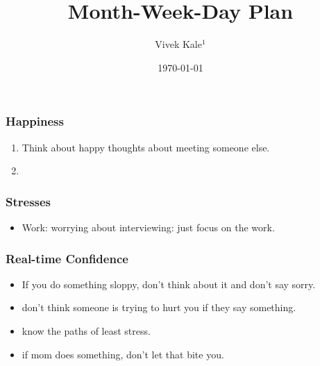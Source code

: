 \documentclass[serif, mathserif, final]{beamer}
\title{Month-Week-Day Plan}
\author{Vivek Kale$^1$}
\institute{$^1$ University of Illinois at Urbana-Champaign}
\date{\today}
\begin{document}
%

      \begin{frame}
        \frametitle{Happiness}
        \begin{enumerate}
          \item Think about happy thoughts about meeting
          someone else.
        \item \tiny
        \end{enumerate}
      \end{frame}

      \begin{frame}
        \frametitle{Stresses}
        \begin{itemize}
        \item \tiny Work: worrying about interviewing: just
          focus on the work.
        \end{itemize}
      \end{frame}

      \begin{frame}
        \frametitle{Real-time Confidence}
        \begin{itemize}
          \tiny \item \tiny If you do something sloppy, don't
          think about it and don't say sorry.
        \item \tiny don't think someone is trying to hurt you if
          they say something.
        \item \tiny know the paths of least stress.
        \item \tiny if mom does something, don't let that bite you.
        \end{itemize}
      \end{frame}
\end{document}
